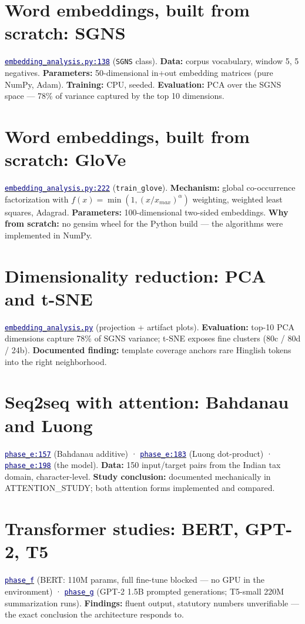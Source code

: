 \documentclass[11pt,a4paper]{article}
\newcommand{\code}[2]{\href{https://github.com/Jayant1711/Tax_Assist-system/blob/v0.7-sprint7/#1}{\texttt{\textcolor{navy}{#2}}}}
\newcommand{\facts}[1]{{\small\textcolor{muted}{#1}\par}}
\begin{document}
\section{Word embeddings, built from scratch: SGNS}
\facts{\code{nlp\_research/embedding\_analysis.py}{embedding\_analysis.py:138}
(\texttt{SGNS} class). \textbf{Data:} corpus vocabulary, window 5, 5 negatives.
\textbf{Parameters:} 50-dimensional in+out embedding matrices (pure NumPy, Adam).
\textbf{Training:} CPU, seeded. \textbf{Evaluation:} PCA over the SGNS space ---
78\% of variance captured by the top 10 dimensions.}

\section{Word embeddings, built from scratch: GloVe}
\facts{\code{nlp\_research/embedding\_analysis.py}{embedding\_analysis.py:222}
(\texttt{train\_glove}). \textbf{Mechanism:} global co-occurrence factorization
with $f(x) = \min(1, (x/x_{max})^{\alpha})$ weighting, weighted least squares,
Adagrad. \textbf{Parameters:} 100-dimensional two-sided embeddings. \textbf{Why
from scratch:} no gensim wheel for the Python build --- the algorithms were
implemented in NumPy.}

\section{Dimensionality reduction: PCA and t-SNE}
\facts{\code{nlp\_research/embedding\_analysis.py}{embedding\_analysis.py}
(projection + artifact plots). \textbf{Evaluation:} top-10 PCA dimensions
capture 78\% of SGNS variance; t-SNE exposes fine clusters (80c / 80d / 24b).
\textbf{Documented finding:} template coverage anchors rare Hinglish tokens into
the right neighborhood.}

\section{Seq2seq with attention: Bahdanau and Luong}
\facts{\code{nlp\_research/phase\_e\_seq2seq.py}{phase\_e:157} (Bahdanau additive)
· \code{nlp\_research/phase\_e\_seq2seq.py}{phase\_e:183} (Luong dot-product) ·
\code{nlp\_research/phase\_e\_seq2seq.py}{phase\_e:198} (the model). \textbf{Data:}
150 input/target pairs from the Indian tax domain, character-level. \textbf{Study
conclusion:} documented mechanically in ATTENTION\_STUDY; both attention forms
implemented and compared.}

\section{Transformer studies: BERT, GPT-2, T5}
\facts{\code{nlp\_research/phase\_f\_bert\_classification.py}{phase\_f} (BERT:
110M params, full fine-tune blocked --- no GPU in the environment) ·
\code{nlp\_research/phase\_g\_generative.py}{phase\_g} (GPT-2 1.5B prompted
generations; T5-small 220M summarization runs). \textbf{Findings:} fluent output,
statutory numbers unverifiable --- the exact conclusion the architecture
responds to.}
\end{document}
